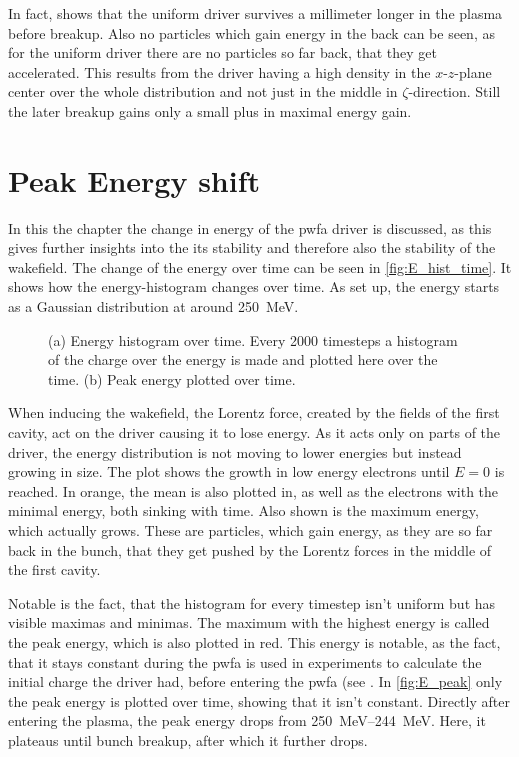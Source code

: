\documentclass[bachelor_thesis]{subfiles}
\begin{document}
In fact,  shows that the uniform driver survives a millimeter longer in the plasma before breakup.
Also no particles which gain energy in the back can be seen, as for the uniform driver there are no particles so far back, that they get accelerated. This results from the driver having a high density in the $x$-$z$-plane center over the whole distribution and not just
in the middle in $\zeta$-direction. Still the later breakup gains only a small plus in maximal energy gain.

\section{Peak Energy shift} \label{chap:E_shift}
In this the chapter the change in energy of the \gls{pwfa} driver is discussed, as this gives further insights into the its stability and therefore also the stability of the wakefield.
The change of the energy over time can be seen in \autoref{fig:E_hist_time}. It shows how the energy-histogram changes over time. As set up, the energy starts as a Gaussian distribution at around \qty{250}{\MeV}.
\begin{figure}
	\centering
	\begin{subfigure}{0.5\textwidth}
	\centering
	\missingfigure{}
	\caption{} \label{fig:E_hist_time}
	\end{subfigure}
	\hfill
	\begin{subfigure}{0.5\textwidth}
	\centering
	\missingfigure{}
	\caption{} \label{fig:E_peak}
	\end{subfigure}
	\caption{(a) Energy histogram over time. Every 2000 timesteps a histogram of the charge over the energy is made and plotted here over the time.
	(b) Peak energy plotted over time.}
	\label{fig:Energy}
\end{figure}
When inducing the wakefield, the Lorentz force, created by the fields of the first cavity, act on the driver causing it to lose energy. As it acts only on parts of the driver, the energy distribution is not moving to lower energies but instead growing in size.
The plot shows the growth in low energy electrons until $E=0$ is reached. In orange, the mean is also plotted in,  as well as the electrons with the minimal energy, both sinking with time. Also shown is the maximum energy, which actually grows.
These are particles, which gain energy, as they are so far back in the bunch, that they get pushed by the Lorentz forces in the middle of the first cavity.

Notable is the fact, that the histogram for every timestep isn't uniform but has visible maximas and minimas. The maximum with the highest energy is called the peak energy, which is also plotted in red.
This energy is notable, as the fact, that it stays constant during the \gls{pwfa} is used in experiments to calculate the initial charge the driver had, before entering the \gls{pwfa} (see \cite{Schoebel2022}.
In \autoref{fig:E_peak} only the peak energy is plotted over time, showing that it isn't constant. Directly after entering the plasma, the peak energy drops from \qtyrange{250}{244}{\MeV}.
Here, it plateaus until bunch breakup, after which it further drops.
\end{document}
